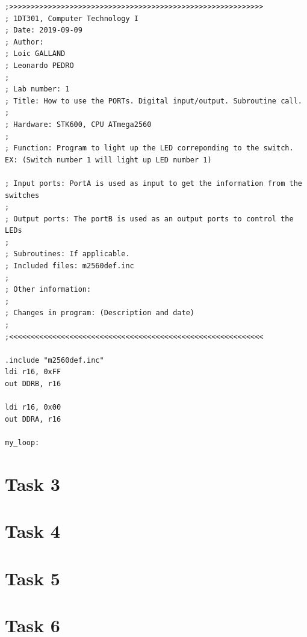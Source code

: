 \documentclass[a4paper,12pt]{article}
\begin{document}
\begin{lstlisting}
;>>>>>>>>>>>>>>>>>>>>>>>>>>>>>>>>>>>>>>>>>>>>>>>>>>>>>>>>>>>
; 1DT301, Computer Technology I
; Date: 2019-09-09
; Author:
; Loic GALLAND
; Leonardo PEDRO
;
; Lab number: 1
; Title: How to use the PORTs. Digital input/output. Subroutine call.
;
; Hardware: STK600, CPU ATmega2560
;
; Function: Program to light up the LED correponding to the switch. EX: (Switch number 1 will light up LED number 1)

; Input ports: PortA is used as input to get the information from the switches 
;
; Output ports: The portB is used as an output ports to control the LEDs
;
; Subroutines: If applicable.
; Included files: m2560def.inc
;
; Other information:
;
; Changes in program: (Description and date)
;
;<<<<<<<<<<<<<<<<<<<<<<<<<<<<<<<<<<<<<<<<<<<<<<<<<<<<<<<<<<<

.include "m2560def.inc"
ldi r16, 0xFF
out DDRB, r16

ldi r16, 0x00
out DDRA, r16

my_loop:

\end{lstlisting}




\section{Task 3}


\section{Task 4}


\section{Task 5}


\section{Task 6}





\end{document}
